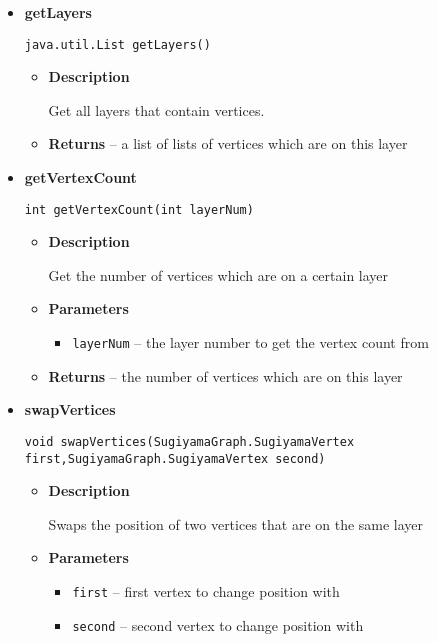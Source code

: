 {{{{{\begin{itemize}
{\begin{itemize}
{Get the amount of layers.
}
\item{{\bf  Returns} -- 
the amount of layers that contain at least one vertex 
}%
\end{itemize}
}%
\item{ 
{\bf  getLayers}\\
\begin{lstlisting}[frame=none]
java.util.List getLayers()\end{lstlisting} %
\begin{itemize}
\item{
{\bf  Description}

Get all layers that contain vertices.
}
\item{{\bf  Returns} -- 
a list of lists of vertices which are on this layer 
}%
\end{itemize}
}%
\item{ 
{\bf  getVertexCount}\\
\begin{lstlisting}[frame=none]
int getVertexCount(int layerNum)\end{lstlisting} %
\begin{itemize}
\item{
{\bf  Description}

Get the number of vertices which are on a certain layer
}
\item{
{\bf  Parameters}
  \begin{itemize}
   \item{
\texttt{layerNum} -- the layer number to get the vertex count from}
  \end{itemize}
}%
\item{{\bf  Returns} -- 
the number of vertices which are on this layer 
}%
\end{itemize}
}%
\item{ 
{\bf  swapVertices}\\
\begin{lstlisting}[frame=none]
void swapVertices(SugiyamaGraph.SugiyamaVertex first,SugiyamaGraph.SugiyamaVertex second)\end{lstlisting} %
\begin{itemize}
\item{
{\bf  Description}

Swaps the position of two vertices that are on the same layer
}
\item{
{\bf  Parameters}
  \begin{itemize}
   \item{
\texttt{first} -- first vertex to change position with}
   \item{
\texttt{second} -- second vertex to change position with}
  \end{itemize}
}%
\end{itemize}
}%
\end{itemize}
}
}
}}}
